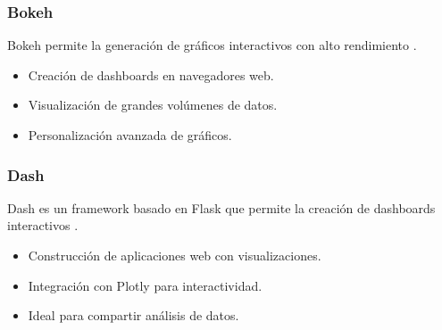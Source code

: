 \subsubsection{Bokeh}
Bokeh permite la generación de gráficos interactivos con alto rendimiento \cite{bokeh2018}.

\begin{itemize}
	\item Creación de dashboards en navegadores web.
	\item Visualización de grandes volúmenes de datos.
	\item Personalización avanzada de gráficos.
\end{itemize}

\subsubsection{Dash}
Dash es un framework basado en Flask que permite la creación de dashboards interactivos \cite{plotly2017dash}.

\begin{itemize}
	\item Construcción de aplicaciones web con visualizaciones.
	\item Integración con Plotly para interactividad.
	\item Ideal para compartir análisis de datos.
\end{itemize}

